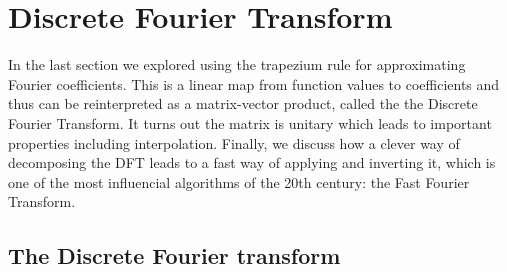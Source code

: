 
\section{Discrete Fourier Transform}
In the last section we explored using the trapezium rule for approximating Fourier coefficients. This is a linear map from function values to coefficients and thus can be reinterpreted as a matrix-vector product, called the the Discrete Fourier Transform. It turns out the matrix is unitary which leads to important properties including interpolation. Finally, we discuss how a clever way of decomposing the DFT leads to a fast way of applying and inverting it, which is one of the most influencial algorithms of the 20th century: the Fast Fourier Transform.

\subsection{The Discrete Fourier transform}
